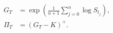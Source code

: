 \documentclass{equation-sheet}
\begin{document}
\begin{equation*}
\begin{aligned}
G_T &= \exp\!\left(\frac{1}{n+1}\sum_{j=0}^{n}\log S_{t_j}\right), \\
\Pi_T &= (G_T-K)^{+}.
\end{aligned}
\end{equation*}
\end{document}
